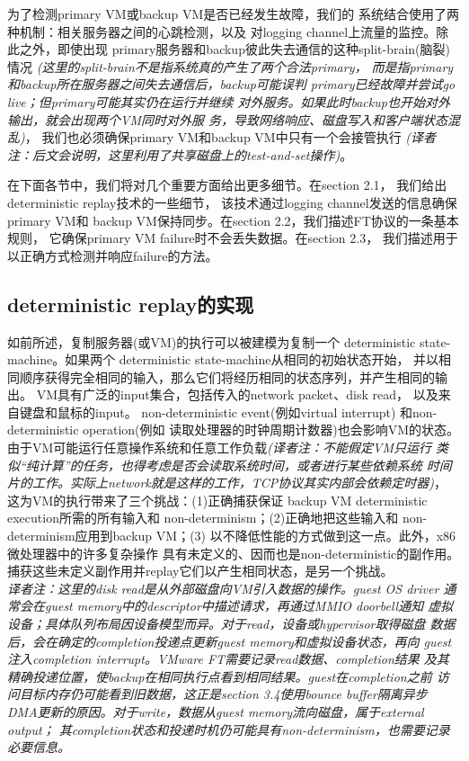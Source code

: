 为了检测primary VM或backup VM是否已经发生故障，我们的%
系统结合使用了两种机制：相关服务器之间的心跳检测，以及%
对logging channel上流量的监控。除此之外，即使出现%
primary服务器和backup彼此失去通信的这种split-brain(脑裂)情况%
\emph{(这里的split-brain不是指系统真的产生了两个合法primary，%
而是指primary和backup所在服务器之间失去通信后，backup可能误判%
primary已经故障并尝试go live；但primary可能其实仍在运行并继续%
对外服务。如果此时backup也开始对外输出，就会出现两个VM同时对外服%
务，导致网络响应、磁盘写入和客户端状态混乱)}，%
我们也必须确保primary VM和backup VM中只有一个会接管执行%
\emph{(译者注：后文会说明，这里利用了共享磁盘上的test-and-set操作)}。%

在下面各节中，我们将对几个重要方面给出更多细节。在section 2.1，%
我们给出deterministic replay技术的一些细节，%
该技术通过logging channel发送的信息确保primary VM和%
backup VM保持同步。在section 2.2，我们描述FT协议的一条基本规则，%
它确保primary VM failure时不会丢失数据。在section 2.3，%
我们描述用于以正确方式检测并响应failure的方法。

\subsection{deterministic replay的实现}

如前所述，复制服务器(或VM)的执行可以被建模为复制一个%
deterministic state-machine。如果两个%
deterministic state-machine从相同的初始状态开始，%
并以相同顺序获得完全相同的输入，那么它们将经历相同的状态序列，并产生相同的输出。%
VM具有广泛的input集合，包括传入的network packet、disk read，
以及来自键盘和鼠标的input。%
non-deterministic event(例如virtual interrupt)%
和non-deterministic operation(例如%
读取处理器的时钟周期计数器)也会影响VM的状态。%
由于VM可能运行任意操作系统和任意工作负载\emph{(译者注：不能假定VM只运行%
类似“纯计算”的任务，也得考虑是否会读取系统时间，或者进行某些依赖系统%
时间片的工作。实际上network就是这样的工作，TCP协议其实内部会依赖定时器)}，%
这为VM的执行带来了三个挑战：(1)正确捕获保证%
backup VM deterministic execution所需的所有输入和%
non-determinism；(2)正确地把这些输入和%
non-determinism应用到backup VM；(3)%
以不降低性能的方式做到这一点。此外，x86微处理器中的许多复杂操作%
具有未定义的、因而也是non-deterministic的副作用。%
捕获这些未定义副作用并replay它们以产生相同状态，是另一个挑战。%
\\\emph{%
译者注：这里的disk read是从外部磁盘向VM引入数据的操作。guest OS driver%
通常会在guest memory中的descriptor中描述请求，再通过MMIO doorbell通知%
虚拟设备；具体队列布局因设备模型而异。对于read，设备或hypervisor取得磁盘%
数据后，会在确定的completion投递点更新guest memory和虚拟设备状态，再向%
guest注入completion interrupt。VMware FT需要记录read数据、completion结果%
及其精确投递位置，使backup在相同执行点看到相同结果。guest在completion之前%
访问目标内存仍可能看到旧数据，这正是section 3.4使用bounce buffer隔离异步%
DMA更新的原因。对于write，数据从guest memory流向磁盘，属于external output；%
其completion状态和投递时机仍可能具有non-determinism，也需要记录必要信息。}%

